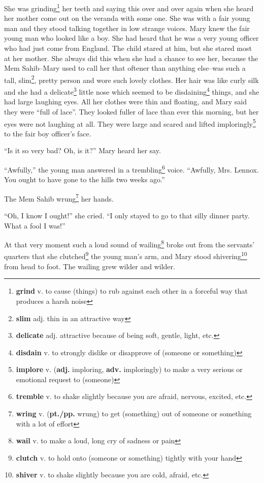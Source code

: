 She was grinding\footnote{\textbf{grind} v. to cause (things) to rub against each other in a forceful way that produces a harsh noise} her teeth and saying this over and over again when she heard her mother come out on the veranda with some one. She was with a fair young man and they stood talking together in low strange voices. Mary knew the fair young man who looked like a boy. She had heard that he was a very young officer who had just come from England. The child stared at him, but she stared most at her mother. She always did this when she had a chance to see her, because the Mem Sahib--Mary used to call her that oftener than anything else--was such a tall, slim\footnote{\textbf{slim} adj. thin in an attractive way}, pretty person and wore such lovely clothes. Her hair was like curly silk and she had a delicate\footnote{\textbf{delicate} adj. attractive because of being soft, gentle, light, etc.} little nose which seemed to be disdaining\footnote{\textbf{disdain} v. to strongly dislike or disapprove of (someone or something)} things, and she had large laughing eyes. All her clothes were thin and floating, and Mary said they were ``full of lace''. They looked fuller of lace than ever this morning, but her eyes were not laughing at all. They were large and scared and lifted imploringly\footnote{\textbf{implore} v. (\textbf{adj.} imploring, \textbf{adv.} imploringly) to make a very serious or emotional request to (someone)} to the fair boy officer's face.

``Is it so very bad? Oh, is it?'' Mary heard her say.

``Awfully,'' the young man answered in a trembling\footnote{\textbf{tremble} v. to shake slightly because you are afraid, nervous, excited, etc.} voice. ``Awfully, Mrs. Lennox. You ought to have gone to the hills two weeks ago.''

The Mem Sahib wrung\footnote{\textbf{wring} v. (\textbf{pt./pp.} wrung) to get (something) out of someone or something with a lot of effort} her hands.

``Oh, I know I ought!'' she cried. ``I only stayed to go to that silly dinner party. What a fool I was!''

At that very moment such a loud sound of wailing\footnote{\textbf{wail} v. to make a loud, long cry of sadness or pain} broke out from the servants' quarters that she clutched\footnote{\textbf{clutch} v. to hold onto (someone or something) tightly with your hand} the young man's arm, and Mary stood shivering\footnote{\textbf{shiver} v. to shake slightly because you are cold, afraid, etc.} from head to foot. The wailing grew wilder and wilder.

